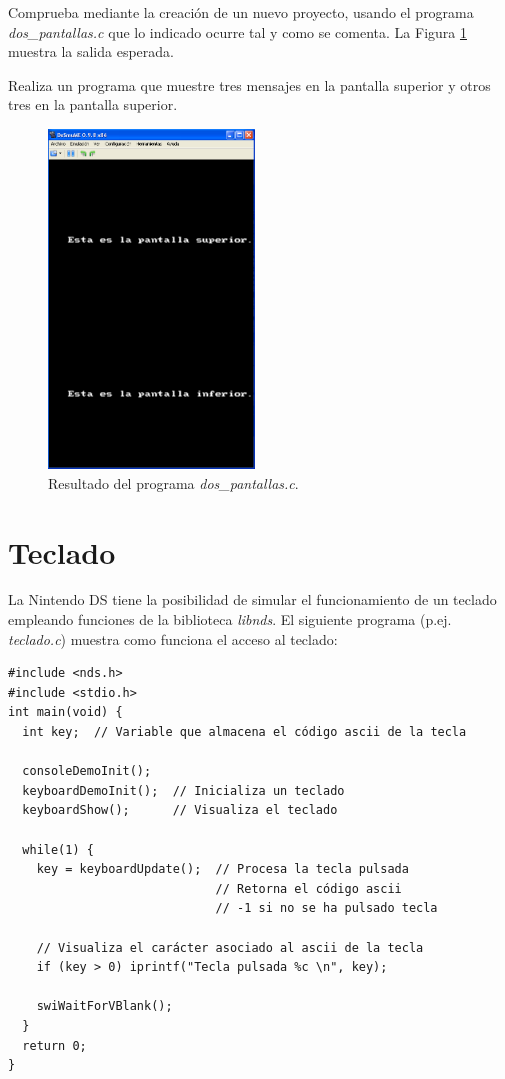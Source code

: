\begin{exercise}
Comprueba mediante la creación de un nuevo proyecto, usando el programa \textit{dos\_pantallas.c} que lo indicado ocurre tal y como se comenta. La Figura \ref{p3_c2_dos_pantallas} muestra la salida esperada.
\end{exercise}


\begin{exercise}
	Realiza un programa que muestre tres mensajes en la pantalla superior y otros tres en la pantalla superior.
\end{exercise}

\begin{figure}[t]
\centering
 \includegraphics[height=9cm]{Figuras/C3/c3_sol-ejercicios-dospantallas.png}
\caption{Resultado del programa \textit{dos\_pantallas.c}.}
\label{p3_c2_dos_pantallas}
\end{figure}

\section{Teclado}
La Nintendo DS tiene la posibilidad de simular el funcionamiento de un teclado empleando funciones de la biblioteca \textit{libnds}. El siguiente programa (p.ej. \textit{teclado.c}) muestra como funciona el acceso al teclado:

\begin{lstlisting}
#include <nds.h>
#include <stdio.h>
int main(void) {    
  int key;  // Variable que almacena el código ascii de la tecla
    
  consoleDemoInit();  
  keyboardDemoInit();  // Inicializa un teclado
  keyboardShow();      // Visualiza el teclado

  while(1) {       
    key = keyboardUpdate();  // Procesa la tecla pulsada
                             // Retorna el código ascii 
                             // -1 si no se ha pulsado tecla 

    // Visualiza el carácter asociado al ascii de la tecla 
    if (key > 0) iprintf("Tecla pulsada %c \n", key); 

    swiWaitForVBlank(); 
  }
  return 0;
}
\end{lstlisting}

